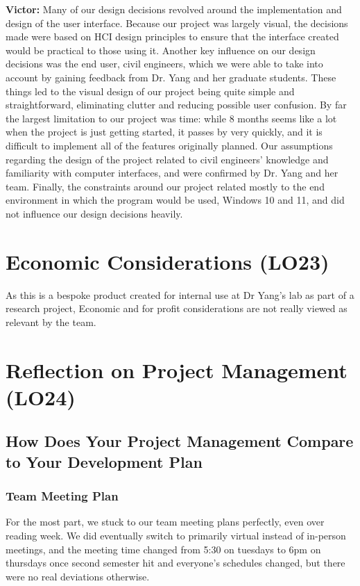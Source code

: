 \documentclass{article}
\begin{document}
\textbf{Victor:} Many of our design decisions revolved around the implementation and design of the user interface. Because our project was largely visual, the decisions made 
were based on HCI design principles to ensure that the interface created would be practical to those using it. Another key influence on our design decisions was the end user, 
civil engineers, which we were able to take into account by gaining feedback from Dr. Yang and her graduate students. These things led to the visual design of our project being 
quite simple and straightforward, eliminating clutter and reducing possible user confusion. By far the largest limitation to our project was time: while 8 months seems like a 
lot when the project is just getting started, it passes by very quickly, and it is difficult to implement all of the features originally planned. Our assumptions regarding the 
design of the project related to civil engineers' knowledge and familiarity with computer interfaces, and were confirmed by Dr. Yang and her team. Finally, the constraints 
around our project related mostly to the end environment in which the program would be used, Windows 10 and 11, and did not influence our design decisions heavily. 

\section{Economic Considerations (LO23)}

As this is a bespoke product created for internal use at Dr Yang's lab as part of a research project, Economic and for profit considerations are not really viewed as relevant by
the team.

\section{Reflection on Project Management (LO24)}


\subsection{How Does Your Project Management Compare to Your Development Plan}

\subsubsection{Team Meeting Plan}
For the most part, we stuck to our team meeting plans perfectly, even over reading week. We did eventually switch to primarily virtual instead of in-person meetings, and the
meeting time changed from 5:30 on tuesdays to 6pm on thursdays once second semester hit and everyone's schedules changed, but there were no real deviations otherwise.
\end{document}
